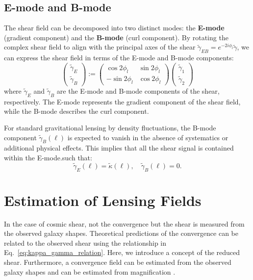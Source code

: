 \subsection{E-mode and B-mode}
The shear field can be decomposed into two distinct modes: the \textbf{E-mode} (gradient component) and the \textbf{B-mode} (curl component). 
By rotating the complex shear field to align with the principal axes of the shear $\tilde{\gamma}_{EB} = e^{-2i\phi_l} \tilde{\gamma}$, we can express the shear field in terms of the E-mode and B-mode components:
\begin{equation}
    \begin{pmatrix}
        \tilde{\gamma}_E \\
        \tilde{\gamma}_B
        \end{pmatrix}
        :=
        \begin{pmatrix}
        \cos 2\phi_l & \sin 2\phi_l \\
        -\sin 2\phi_l & \cos 2\phi_l
        \end{pmatrix}
        \begin{pmatrix}
        \tilde{\gamma}_1 \\
        \tilde{\gamma}_2
    \end{pmatrix}
    \label{eq:EB_decomposition}
\end{equation}
where $\tilde{\gamma}_E$ and $\tilde{\gamma}_B$ are the E-mode and B-mode components of the shear, respectively. The E-mode represents the gradient component of the shear field, while the B-mode describes the curl component.

For standard gravitational lensing by density fluctuations, the B-mode component $\tilde{\gamma}_B(\boldsymbol{\ell})$ is expected to vanish in the absence of systematics or additional physical effects. This implies that all the shear signal is contained within the E-mode.such that:
\begin{equation}
    \tilde{\gamma}_E(\boldsymbol{\ell}) = \tilde{\kappa}(\boldsymbol{\ell}), \quad \tilde{\gamma}_B(\boldsymbol{\ell}) = 0.
    \label{eq:EB_decomposition_standard}
\end{equation}

\section{Estimation of Lensing Fields}
In the case of cosmic shear, not the convergence but the shear is measured from the observed galaxy shapes. Theoretical predictions of the convergence can be related to the observed shear using the relationship in Eq.~\eqref{eq:kappa_gamma_relation}. 
Here, we introduce a concept of the reduced shear. Furthermore, a convergence field can be estimated from the observed galaxy shapes \citep{1993ApJ...404..441K} and can be estimated from magnification \citep{2001PhR...340..291B}.

